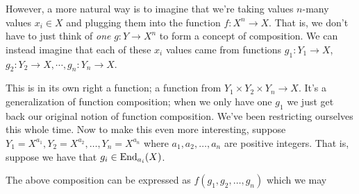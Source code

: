 However, a more natural way is to imagine that we're taking values 
$n$-many values $x_i \in X$ and plugging them into the function $f: X^n \to X$. 
That is, we don't have to just think of \emph{one} $g: Y \to X^n$ to form a concept of 
composition. We can instead imagine that each of these $x_i$ values came 
from functions $g_1: Y_1 \to X$, $g_2: Y_2 \to X, \cdots, g_n: Y_n \to X$. 
\begin{center}
\end{center}
This is in its own right a function; a function from $Y_1 \times Y_2 \times Y_n \to X$.
It's a generalization of function composition; when we only have one $g_1$ we just 
get back our original notion of function composition. We've been restricting ourselves this whole time.
Now to make this even more interesting, suppose $Y_1 = X^{a_1}, Y_2 = X^{a_2}, \dots, Y_n = X^{a_n}$
where $a_1, a_2, \dots, a_n$ are positive integers. That is, suppose we have that $g_i \in \operatorname{\mathrm{End}}_{a_i}(X)$. 
\begin{center}
\end{center}
The above composition can be expressed as $f(g_1, g_2, \dots, g_n)$ which we may  
